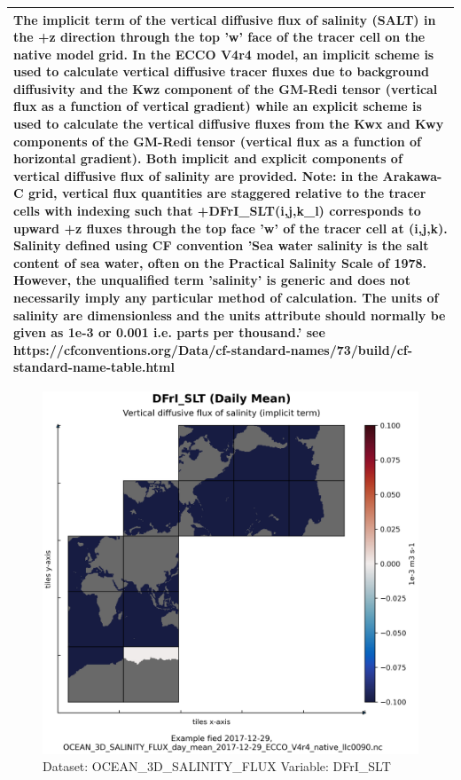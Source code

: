\begin{longtable}{|m{}|m{}|m{}|m{}|}
\multicolumn{4}{|p{1\textwidth}|}{The implicit term of the vertical diffusive flux of salinity (SALT) in the +z direction through the top 'w' face of the tracer cell on the native model grid. In the ECCO V4r4 model, an implicit scheme is used to calculate vertical diffusive tracer fluxes due to background diffusivity and the Kwz component of the GM-Redi tensor (vertical flux as a function of vertical gradient) while an explicit scheme is used to calculate the vertical diffusive fluxes from the Kwx and Kwy components of the GM-Redi tensor (vertical flux as a function of horizontal gradient). Both implicit and explicit components of vertical diffusive flux of salinity are provided. Note: in the Arakawa-C grid, vertical flux quantities are staggered relative to the tracer cells with indexing such that +DFrI\_SLT(i,j,k\_l) corresponds to upward +z fluxes through the top face 'w' of the tracer cell at (i,j,k). Salinity defined using CF convention 'Sea water salinity is the salt content of sea water, often on the Practical Salinity Scale of 1978. However, the unqualified term 'salinity' is generic and does not necessarily imply any particular method of calculation. The units of salinity are dimensionless and the units attribute should normally be given as 1e-3 or 0.001 i.e. parts per thousand.' see https://cfconventions.org/Data/cf-standard-names/73/build/cf-standard-name-table.html} \\ \hline
\end{longtable}

\begin{figure}[H]
\centering
\includegraphics[scale=0.55]{../images/plots/native_plots/Ocean_Three-Dimensional_Salinity_Fluxes/DFrI_SLT.png}
\caption{Dataset: OCEAN\_3D\_SALINITY\_FLUX Variable: DFrI\_SLT}
\label{tab:table-OCEAN_3D_SALINITY_FLUX_DFrI_SLT-Plot}
\end{figure}
\pagebreak
